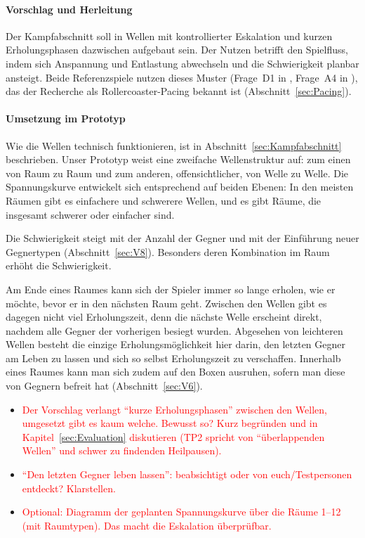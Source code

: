 \documentclass[../Main.tex]{subfiles}
\begin{document}
\paragraph{Vorschlag und Herleitung}
Der Kampfabschnitt soll in Wellen mit kontrollierter Eskalation und kurzen Erholungsphasen dazwischen aufgebaut sein. Der Nutzen betrifft den Spielfluss, indem sich Anspannung und Entlastung abwechseln und die Schwierigkeit planbar ansteigt. Beide Referenzspiele nutzen dieses Muster (Frage~D1 in , Frage~A4 in ), das der Recherche als Rollercoaster-Pacing bekannt ist (Abschnitt~\ref{sec:Pacing}).

\paragraph{Umsetzung im Prototyp}
Wie die Wellen technisch funktionieren, ist in Abschnitt~\ref{sec:Kampfabschnitt} beschrieben. Unser Prototyp weist eine zweifache Wellenstruktur auf: zum einen von Raum zu Raum und zum anderen, offensichtlicher, von Welle zu Welle. Die Spannungskurve entwickelt sich entsprechend auf beiden Ebenen: In den meisten Räumen gibt es einfachere und schwerere Wellen, und es gibt Räume, die insgesamt schwerer oder einfacher sind.

Die Schwierigkeit steigt mit der Anzahl der Gegner und mit der Einführung neuer Gegnertypen (Abschnitt~\ref{sec:V8}). Besonders deren Kombination im Raum erhöht die Schwierigkeit.

Am Ende eines Raumes kann sich der Spieler immer so lange erholen, wie er möchte, bevor er in den nächsten Raum geht. Zwischen den Wellen gibt es dagegen nicht viel Erholungszeit, denn die nächste Welle erscheint direkt, nachdem alle Gegner der vorherigen besiegt wurden. Abgesehen von leichteren Wellen besteht die einzige Erholungsmöglichkeit hier darin, den letzten Gegner am Leben zu lassen und sich so selbst Erholungszeit zu verschaffen. Innerhalb eines Raumes kann man sich zudem auf den Boxen ausruhen, sofern man diese von Gegnern befreit hat (Abschnitt~\ref{sec:V6}).

\begin{itemize}[leftmargin=1.5cm]
    \item \textcolor{red}{Der Vorschlag verlangt \enquote{kurze Erholungsphasen} zwischen den Wellen, umgesetzt gibt es kaum welche. Bewusst so? Kurz begründen und in Kapitel~\ref{sec:Evaluation} diskutieren (TP2 spricht von \enquote{überlappenden Wellen} und schwer zu findenden Heilpausen).}
    \item \textcolor{red}{\enquote{Den letzten Gegner leben lassen}: beabsichtigt oder von euch/Testpersonen entdeckt? Klarstellen.}
    \item \textcolor{red}{Optional: Diagramm der geplanten Spannungskurve über die Räume 1--12 (mit Raumtypen). Das macht die Eskalation überprüfbar.}
\end{itemize}
\end{document}
